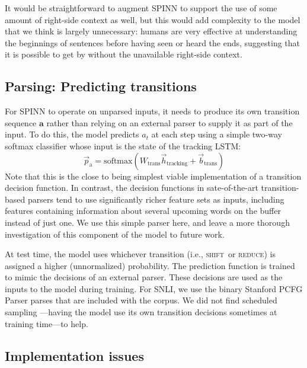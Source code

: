 \documentclass[11pt]{article}
\newcommand{\shift}{\textsc{shift}}
\newcommand{\reduce}{\textsc{reduce}}
\begin{document}
It would be straightforward to augment SPINN to support the use of some amount of right-side context as well, but this would add complexity to the model that we think is largely unnecessary: humans are very effective at understanding the beginnings of sentences before having seen or heard the ends, suggesting that it is possible to get by without the unavailable right-side context.

\subsection{Parsing: Predicting transitions}

For SPINN to operate on unparsed inputs, it needs to produce its own transition sequence $\mathbf a$ rather than relying on an external parser to supply it as part of the input. To do this, the model predicts $a_t$ at each step using a simple two-way softmax classifier whose input is the state of the tracking LSTM:
\begin{equation}
\vec{p}_{\text{a}} = \text{softmax}(W_{\text{trans}}\vec{h}_{\text{tracking}} + \vec{b}_{\text{trans}})
\end{equation}
Note that this is the close to being simplest viable implementation of a transition decision function. In contrast, the decision functions in sate-of-the-art transition-based parsers tend to use significantly richer feature sets as inputs, including features containing information about several upcoming words on the buffer instead of just one. We use this simple parser here, and leave a more thorough investigation of this component of the model to future work.

At test time, the model uses whichever transition (i.e., \shift\ or \reduce) is assigned a higher (unnormalized) probability. The prediction function is trained to mimic the decisions of an external parser. These decisions are used as the inputs to the model during training. For SNLI, we use the binary Stanford PCFG Parser parses that are included with the corpus. We did not find scheduled sampling \citep{bengio2015scheduled}---having the model use its own transition decisions sometimes at training time---to help.

\subsection{Implementation issues}
\end{document}
